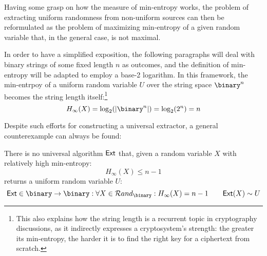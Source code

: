 
Having some grasp on how the measure of min-entropy works, the problem of extracting uniform randomness from non-uniform sources can then be reformulated as the problem of maximizing min-entropy of a given random variable that, in the general case, is not maximal.

In order to have a simplified exposition, the following paragraphs will deal with binary strings of some fixed length $n$ as outcomes, and the definition of min-entropy will be adapted to employ a base-2 logarithm. In this framework, the min-entrpoy of a uniform random variable $U$ over the string space $\binary^n$ becomes the string length itself:\footnote{This also explains how the string length is a recurrent topic in cryptography discussions, as it indirectly expresses a cryptosystem's strength: the greater its min-entropy, the harder it is to find the right key for a ciphertext from scratch.}
\[
    H_\infty(X) = \log_2(|\binary^n|) = \log_2(2^n) = n
\]

Despite such efforts for constructing a universal extractor, a general counterexample can always be found:


\begin{claim}
    There is no universal algorithm $\textup{\textsf{Ext}}$ that, given a random variable $X$ with relatively high min-entropy:
    \[
        H_\infty(X) \leq n - 1
    \]
    returns a uniform random variable $U$:
    \[
        \Extm \in \binary \to \binary : \forall X \in \mathcal{R}and_{\binary} : H_\infty(X) = n - 1 \qquad \Extm(X) \sim U
    \]
\end{claim}

